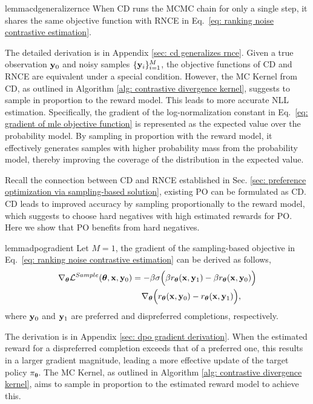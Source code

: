 \begin{restatable}{lemma}{cdgeneralizernce}
\label{prop: cd generalizes rnce}
When CD runs the MCMC chain for only a single step,
it shares the same objective function with RNCE in Eq.~\eqref{eq: ranking noise contrastive estimation}.
\end{restatable}
The detailed derivation is in Appendix \ref{sec: cd generalizes rnce}.
Given a true observation $\mathbf{y}_0$ and noisy samples $\{\mathbf{y}_i\}_{i=1}^M$, the objective functions of CD and RNCE are equivalent under a special condition. 
However, the MC Kernel from CD, as outlined in Algorithm \ref{alg: contrastive divergence kernel}, suggests to sample in proportion to the reward model. 
This leads to more accurate NLL estimation.
Specifically, the gradient of the log-normalization constant in Eq.~\eqref{eq: gradient of mle objective function} is represented as the expected value over the probability model. 
By sampling in proportion with the reward model, it effectively generates samples with higher probability mass from the probability model, thereby improving the coverage of the distribution in the expected value.


Recall the connection between CD and RNCE established in Sec. \ref{sec: preference optimization via sampling-based solution},
existing PO can be formulated as CD.
CD leads to improved accuracy by sampling proportionally to the reward model,
which suggests to choose hard negatives with high estimated rewards for PO.
Here we show that PO benefits from hard negatives.
\begin{restatable}{lemma}{dpogradient}
\label{prop: dpo gradient}
Let $M=1$,
the gradient of the sampling-based objective in Eq.~\eqref{eq: ranking noise contrastive estimation} can be derived as follows,
\begin{align*}
\nabla_{\boldsymbol\theta} \mathcal{L}^{Sample}(\boldsymbol\theta, \mathbf{x}, \mathbf{y}_0)
& =
-
\beta
\sigma
\Big(
\beta
r_{\boldsymbol\theta}(\mathbf{x}, \mathbf{y}_1)
-
\beta
r_{\boldsymbol\theta}(\mathbf{x}, \mathbf{y}_0)
\Big)
\\ \nonumber
& \;\;\;\;
\nabla_{\boldsymbol\theta}
\Big(
r_{\boldsymbol\theta}(\mathbf{x}, \mathbf{y}_0)
-
r_{\boldsymbol\theta}(\mathbf{x}, \mathbf{y}_1)
\Big),
\end{align*}
where $\mathbf{y}_0$ and $\mathbf{y}_1$ are preferred and dispreferred completions, respectively.
\end{restatable}
The derivation is in Appendix \ref{sec: dpo gradient derivation}.
When the estimated reward for a dispreferred completion exceeds that of a preferred one, this results in a larger gradient magnitude, leading a more effective update of the target policy $\pi_{\boldsymbol\theta}$. 
The MC Kernel, as outlined in Algorithm \ref{alg: contrastive divergence kernel}, aims to sample in proportion to the estimated reward model to achieve this.


